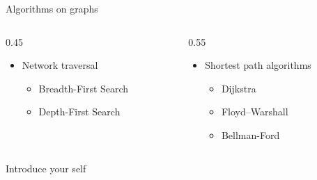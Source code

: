     \begin{frame}{Algorithms on graphs}
        \begin{columns}[t] %
            \begin{column}{0.45\textwidth}
                \begin{itemize}
                    \item \alert{Network traversal}
                    \begin{itemize}
                        \item Breadth-First Search
                        \item Depth-First Search
                    \end{itemize}
                \end{itemize}
            \end{column}
            
            \begin{column}{0.55\textwidth}
                \begin{itemize}
                    \item \alert{Shortest path algorithms}
                    \begin{itemize}
                        \item Dijkstra
                        \item Floyd–Warshall
                        \item Bellman-Ford
                    \end{itemize}
                \end{itemize}
            \end{column}
        \end{columns}

        \begin{note}
            {Introduce your self}
        \end{note}
    \end{frame}

